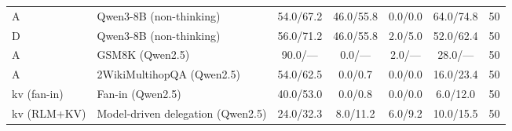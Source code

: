 \begin{table}[t]
\begin{tabular}{llccccc}
A            & Qwen3-8B (non-thinking)     & 54.0/67.2 & 46.0/55.8& 0.0/0.0  & 64.0/74.8 & 50 \\
D            & Qwen3-8B (non-thinking)     & 56.0/71.2 & 46.0/55.8& 2.0/5.0  & 52.0/62.4 & 50 \\
A            & GSM8K (Qwen2.5)             & 90.0/---  & 0.0/---  & 2.0/---  & 28.0/---  & 50 \\
A            & 2WikiMultihopQA (Qwen2.5)   & 54.0/62.5 & 0.0/0.7  & 0.0/0.0  & 16.0/23.4 & 50 \\
kv (fan-in)  & Fan-in (Qwen2.5)            & 40.0/53.0 & 0.0/0.8  & 0.0/0.0  & 6.0/12.0  & 50 \\
kv (RLM+KV)  & Model-driven delegation (Qwen2.5) & 24.0/32.3 & 8.0/11.2 & 6.0/9.2  & 10.0/15.5 & 50 \\
\bottomrule
\end{tabular}
\end{table}

